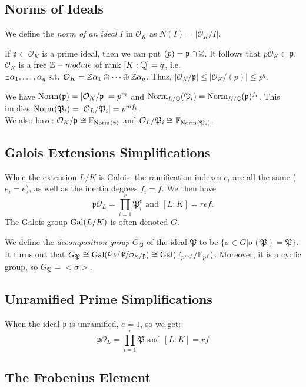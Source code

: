 \subsection{Norms of Ideals}
We define the \textit{norm of an ideal} $I$ in $\mathcal{O}_K$ as $N(I)=|\mathcal{O}_K/I|$.

If $\mathfrak{p} \subset \mathcal{O}_K$ is a prime ideal, then we can put $(p)=\mathfrak{p} \cap \Z$.
It follows that $p\mathcal{O}_K \subset \mathfrak{p}$.
$\mathcal{O}_K$ is a free $\Z-module$ of rank $[K:\Q]=q$, i.e. $\exists \alpha_1,\dots,\alpha_q \text{ s.t. } \mathcal{O}_K=\Z \alpha_1 \oplus \cdots \oplus \Z \alpha_q$.
Thus, $|\mathcal{O}_K/\mathfrak{p}| \leq |\mathcal{O}_K/(p)| \leq p^q$.

We have $\Norm{\mathfrak{p}} = |\mathcal{O}_K/\mathfrak{p}|=p^m$ and $\Norm[L/\Q]{\mathfrak{P}_i} = \Norm[K/\Q]{\mathfrak{p}}^{f_i}$.
This implies $\Norm{\mathfrak{P}_i} = |\mathcal{O}_L/\mathfrak{P}_i| = p^{mf_i}$.\\
We also have: 
$\mathcal{O}_K/\mathfrak{p} \cong \mathbb{F}_{\Norm{\mathfrak{p}}}$ and $\mathcal{O}_L/\mathfrak{P}_i \cong \mathbb{F}_{\Norm{\mathfrak{P}_i}}$.

\subsection{Galois Extensions Simplifications}
When the extension $L/K$ is Galois, the ramification indexes $e_i$ are all the same ($e_i=e$), as well as the inertia degrees $f_i=f$.
We then have
$$
\mathfrak{p}\mathcal{O}_L = \prod_{i=1}^r \mathfrak{P}_i^{e}
\text{ and } [L:K] = ref.
$$
The Galois group $\Gal{L/K}$ is often denoted $G$.

We define the \textit{decomposition group} $G_{\mathfrak{P}}$ of the ideal $\mathfrak{P}$ to be $\{\sigma \in G | \sigma(\mathfrak{P})=\mathfrak{P} \}$.
It turns out that 
$G_{\mathfrak{P}} 
\cong \Gal{\nicefrac{\mathcal{O}_L/\mathfrak{P}}{\mathcal{O}_K/\mathfrak{p}}}
\cong \Gal{ \mathbb{F}_{p^{mf}}/\mathbb{F}_{p^{f}}}$.
Moreover, it is a cyclic group, so $G_{\mathfrak{P}} = <\tilde{\sigma}>$.

\subsection{Unramified Prime Simplifications}
When the ideal $\mathfrak{p}$ is unramified, $e=1$, so we get:
$$
\mathfrak{p}\mathcal{O}_L 
= \prod_{i=1}^r \mathfrak{P} \text{ and } [L:K] = rf
$$

\subsection{The Frobenius Element}
